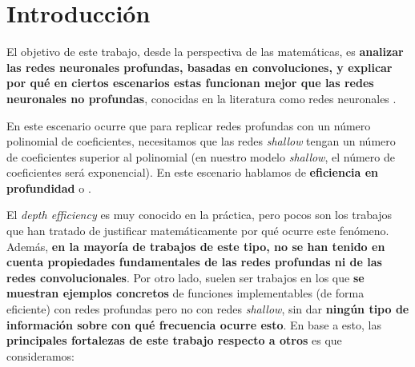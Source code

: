 
\chapter{Introducción}\label{ch:introduccion}

El objetivo de este trabajo, desde la perspectiva de las matemáticas, es \textbf{analizar las redes neuronales profundas, basadas en convoluciones, y explicar por qué en ciertos escenarios estas funcionan mejor que las redes neuronales no profundas}, conocidas en la literatura como redes neuronales .

En este escenario ocurre que para replicar redes profundas con un número polinomial de coeficientes, necesitamos que las redes \textit{shallow} tengan un número de coeficientes superior al polinomial (en nuestro modelo \textit{shallow}, el número de coeficientes será exponencial). En este escenario hablamos de \textbf{eficiencia en profundidad} o \textbf{}.

El \textit{depth efficiency} es muy conocido en la práctica, pero pocos son los trabajos que han tratado de justificar matemáticamente por qué ocurre este fenómeno. Además, \textbf{en la mayoría de trabajos de este tipo, no se han tenido en cuenta propiedades fundamentales de las redes profundas ni de las redes convolucionales}. Por otro lado, suelen ser trabajos en los que \textbf{se muestran ejemplos concretos} de funciones implementables (de forma eficiente) con redes profundas pero no con redes \textit{shallow}, sin dar \textbf{ningún tipo de información sobre con qué frecuencia ocurre esto}. En base a esto, las \textbf{principales fortalezas de este trabajo respecto a otros} es que consideramos:

